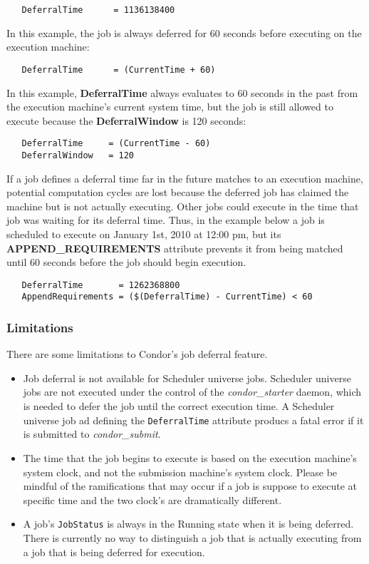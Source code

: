 \documentclass[a4paper, 11pt]{article}
\newcommand{\AdAttr}[1]{\texttt{#1}}	%
\newcommand{\SubmitCmd}[1]{\textbf{#1}}		%
\newcommand{\Prog}[1]{\textit{#1}}              	%
\newcommand{\Condor}[1]{\Prog{condor\_#1}}
\begin{document}
\begin{verbatim} 
   DeferralTime      = 1136138400
\end{verbatim} 

In this example, the job is always deferred for 60 seconds before
executing on the execution machine:

\begin{verbatim} 
   DeferralTime      = (CurrentTime + 60)
\end{verbatim}

In this example, \SubmitCmd{DeferralTime} always evaluates to 60 seconds
in the past from the execution machine's current system time, but the job is still allowed to execute because the \SubmitCmd{DeferralWindow} is 120 seconds:

\begin{verbatim} 
   DeferralTime     = (CurrentTime - 60)
   DeferralWindow   = 120
\end{verbatim}

If a job defines a deferral time far in the future matches to an execution machine, potential computation cycles are lost because the deferred job has claimed the machine but is not actually executing. Other jobs could execute in the time that job was waiting for its deferral time. Thus, in the example below a job is scheduled to execute on January 1st, 2010 at 12:00 pm, but its \SubmitCmd{APPEND\_REQUIREMENTS} attribute prevents it from being matched until 60 seconds before the job should begin execution. 

\begin{verbatim}
   DeferralTime       = 1262368800
   AppendRequirements = ($(DeferralTime) - CurrentTime) < 60
\end{verbatim}

\subsubsection{Limitations}
\label{sec:jobdeferral-limitations}
There are some limitations to Condor's job deferral feature.

\begin{itemize}
\item Job deferral is not available for Scheduler universe jobs. Scheduler universe jobs are not executed under the control of the \Condor{starter} daemon, which is needed to defer the job until the correct execution time. A Scheduler universe job ad defining the \AdAttr{DeferralTime} attribute producs a fatal error if it is submitted to \Condor{submit}.

\item The time that the job begins to execute is based on the execution machine's system clock, and not the submission machine's system clock. Please be mindful of the ramifications that may occur if a job is suppose to execute at specific time and the two clock's are dramatically different.

\item A job's \AdAttr{JobStatus} is always in the Running state when it is being deferred. There is currently no way to distinguish a job that is actually executing from a job that is being deferred for execution. 
\end{itemize}
\end{document}
